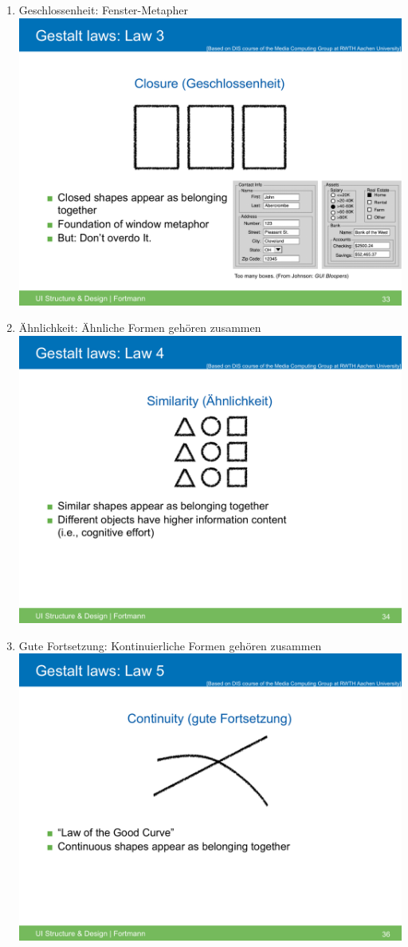 \begin{enumerate}[1.]
\item
  Geschlossenheit: Fenster-Metapher \includegraphics{inc/gestalt_3.pdf}
\item
  Ähnlichkeit: Ähnliche Formen gehören zusammen
  \includegraphics{inc/gestalt_4.pdf}
\item
  Gute Fortsetzung: Kontinuierliche Formen gehören zusammen
  \includegraphics{inc/gestalt_5_1.pdf}

\end{enumerate}
